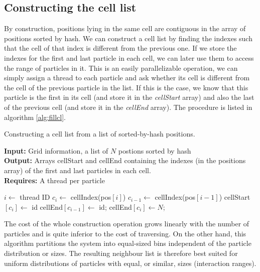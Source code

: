 \documentclass[twoside,openright,titlepage,numbers=noenddot,%
headinclude,footinclude,cleardoublepage=empty,abstract=on,
BCOR=5mm,fontsize=11pt, dvipsnames, paper=b5
]{scrreprt}
\begin{document}
\subsection*{Constructing the cell list}
By construction, positions lying in the same cell are contiguous in the array of positions sorted by hash. We can construct a cell list by finding the indexes such that the cell of that index is different from the previous one. If we store the indexes for the first and last particle in each cell, we can later use them to access the range of particles in it.
This is an easily parallelizable operation, we can simply assign a thread to each particle and ask whether its cell is different from the cell of the previous particle in the list. If this is the case, we know that this particle is the first in its cell (and store it in the \emph{cellStart} array) and also the last of the previous cell (and store it in the \emph{cellEnd} array). The procedure is listed in algorithm \ref{alg:fillcl}.
\begin{algorithm}
  \caption[ ]{Constructing a cell list from a list of sorted-by-hash positions.} \label{alg:fillcl}
  \textbf{Input:} Grid information, a list of $N$ postions sorted by hash\\
  \textbf{Output:} Arrays cellStart and cellEnd containing the indexes (in the positions array) of the first and last particles in each cell.\\
  \textbf{Requires:} A thread per particle
  \begin{algorithmic}[1]
    \State $i\gets$ thread ID 
    \State $c_i\gets$ cellIndex(pos$[i]$)
    \State $c_{i-1}\gets$ cellIndex(pos$[i-1]$)
    \EndIf
    \State cellStart$[c_i]\gets$ id
    \State cellEnd$[c_{i-1}]\gets$ id;
    \EndIf
    \EndIf
    \State cellEnd$[c_i]\gets N$;
    \EndIf
  \end{algorithmic}
\end{algorithm}

The cost of the whole construction operation grows linearly with the number of particles and is quite inferior to the cost of traversing. On the other hand, this algorithm partitions the system into equal-sized bins independent of the particle distribution or sizes. The resulting neighbour list is therefore best suited for uniform distributions of particles with equal, or similar, sizes (interaction ranges).
\end{document}
